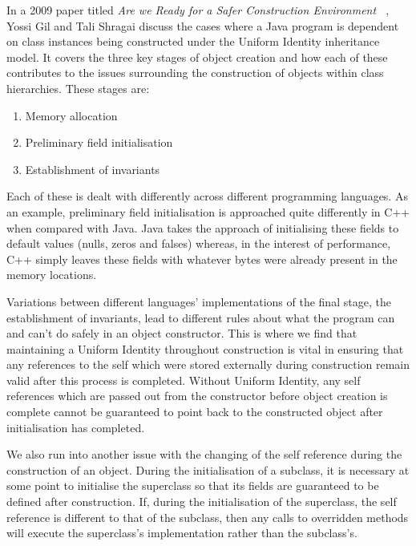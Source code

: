 In a 2009 paper titled \textit{Are we Ready for a Safer Construction Environment ~\cite{SaferConstruction}}, Yossi Gil and Tali Shragai discuss the cases where a Java program is dependent on class instances being constructed under the Uniform Identity inheritance model. It covers the three key stages of object creation and how each of these contributes to the issues surrounding the construction of objects within class hierarchies. These stages are:
\begin{enumerate}
	\item Memory allocation
	\item Preliminary field initialisation
	\item Establishment of invariants
\end{enumerate}
Each of these is dealt with differently across different programming languages. As an example, preliminary field initialisation is approached quite differently in C++ when compared with Java. Java takes the approach of initialising these fields to default values (nulls, zeros and falses) whereas, in the interest of performance, C++ simply leaves these fields with whatever bytes were already present in the memory locations.

Variations between different languages’ implementations of the final stage, the establishment of invariants, lead to different rules about what the program can and can't do safely in an object constructor. This is where we find that maintaining a Uniform Identity throughout construction is vital in ensuring that any references to the self which were stored externally during construction remain valid after this process is completed. Without Uniform Identity, any self references which are passed out from the constructor before object creation is complete cannot be guaranteed to point back to the constructed object after initialisation has completed.
\newline

We also run into another issue with the changing of the self reference during the construction of an object. During the initialisation of a subclass, it is necessary at some point to initialise the superclass so that its fields are guaranteed to be defined after construction. If, during the initialisation of the superclass, the self reference is different to that of the subclass, then any calls to overridden methods will execute the superclass's implementation rather than the subclass's.
\newline

